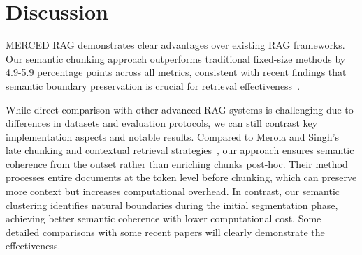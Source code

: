 \documentclass[10pt,twocolumn,letterpaper]{article}
\begin{document}
\section{Discussion}

MERCED RAG demonstrates clear advantages over existing RAG frameworks. Our semantic chunking approach outperforms traditional fixed-size methods by 4.9-5.9 percentage points across all metrics, consistent with recent findings that semantic boundary preservation is crucial for retrieval effectiveness~\cite{zhang2024semantic}.

\vspace{0.5em}
While direct comparison with other advanced RAG systems is challenging due to differences in datasets and evaluation protocols, we can still contrast key implementation aspects and notable results. Compared to Merola and Singh's late chunking and contextual retrieval strategies~\cite{merola2025reconstructing}, our approach ensures semantic coherence from the outset rather than enriching chunks post-hoc. Their method processes entire documents at the token level before chunking, which can preserve more context but increases computational overhead. In contrast, our semantic clustering identifies natural boundaries during the initial segmentation phase, achieving better semantic coherence with lower computational cost. Some detailed comparisons with some recent papers will clearly demonstrate the effectiveness.
\end{document}
